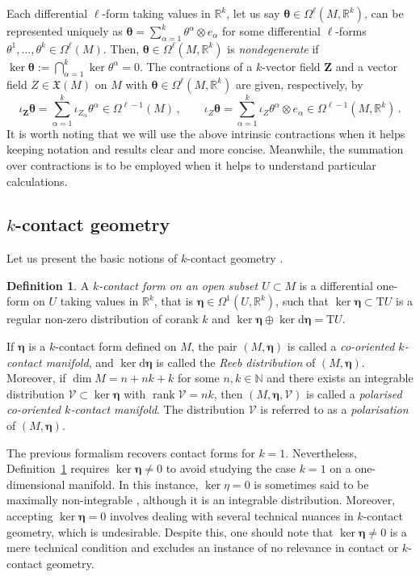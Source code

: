 \documentclass[11pt,twoside]{article}
\theoremstyle{plain}
\theoremstyle{definition}
\newtheorem{definition}[theorem]{Definition}
\theoremstyle{remark}
\newcommand{\R}{\mathbb{R}}
\newcommand{\dd}{\mathrm{d}}
\newcommand{\T}{\mathrm{T}}
\DeclareMathOperator{\rk}{rank}
\begin{document}
Each differential $\ell$-form taking values in $\mathbb{R}^k$, let us say $\bm\theta\in \Omega^\ell(M,\R^k)$, can be represented uniquely as $\bm\theta=\sum_{\alpha=1}^k\theta^\alpha\otimes e_\alpha$ for some differential $\ell$-forms $\theta^1,\dotsc,\theta^k \in \Omega^\ell(M)$. 
Then, $\bm\theta\in \Omega^\ell(M,\R^k)$ is {\it nondegenerate} if $\ker\bm\theta:=\bigcap^k_{\alpha=1}\ker\theta^\alpha=0$.
The contractions of a $k$-vector field ${\bm Z}$ and a vector field $Z\in \mathfrak{X}(M)$ on $M$ with $\bm \theta\in \Omega^\ell(M,\mathbb{R}^k)$ are given, respectively, by
$$
\iota_{\bm Z}\bm \theta=\sum_{\alpha=1}^k\iota_{Z_\alpha}\theta^\alpha \in \Omega^{\ell-1}(M)\,,\qquad
\iota_{Z}\bm \theta=\sum_{\alpha=1}^k\iota_{Z}\theta^\alpha\otimes e_\alpha\in \Omega^{\ell-1}(M,\mathbb{R}^k)\,.
$$
It is worth noting that we will use the above intrinsic contractions when it helps keeping notation and results clear and more concise. Meanwhile,  the summation over contractions is to be employed when it helps to understand particular calculations.
\subsection{\texorpdfstring{$k$}--contact geometry}

Let us present the basic notions of $k$-contact geometry \cite{LRS_25,GGMRR_20,GGMRR_21}. 

\begin{definition}\label{def:k-form}
A \textit{$k$-contact form on an open subset $U \subset M$} is a differential one-form on $U$ taking values in $\mathbb{R}^k$, that is $\bm{\eta} \in \Omega^1(U,\mathbb{R}^k)$, such that
 $\ker \bm{\eta} \subset \T U$ is a regular non-zero distribution of corank $k$ and $\ker \bm{\eta} \oplus \ker \dd \bm{\eta} = \T U$.

If $\bm{\eta}$ is a $k$-contact form defined on $M$, the pair $(M,\bm{\eta})$ is called a \textit{co-oriented $k$-contact manifold}, and $\ker \dd \bm{\eta}$ is called the \textit{Reeb distribution} of $(M,\bm{\eta})$. Moreover, if $\dim M = n + nk + k$ for some $n,k \in \mathbb{N}$ and there exists an integrable distribution $\mathcal{V} \subset \ker \bm{\eta}$ with $\rk \mathcal{V} = nk$, then $(M,\bm{\eta},\mathcal{V})$ is called a \textit{polarised co-oriented $k$-contact manifold}. The distribution $\mathcal{V}$ is referred to as a \textit{polarisation} of $(M,\bm{\eta})$.
\end{definition} 

The previous formalism recovers contact forms for $k=1$. Nevertheless, Definition~\ref{def:k-form} requires $\ker \bm{\eta}\neq 0$ to avoid studying the case $k=1$ on a one-dimensional manifold. In this instance, $\ker \eta=0$ is sometimes said to be maximally non-integrable \cite{GG_22}, although it is an integrable distribution. Moreover, accepting $\ker\bm\eta=0$ involves dealing with several technical nuances in $k$-contact geometry, which is undesirable. Despite this, one should note that $\ker \bm{\eta}\neq 0$ is a mere technical condition and excludes an instance of no relevance in contact or $k$-contact geometry. 
\end{document}
